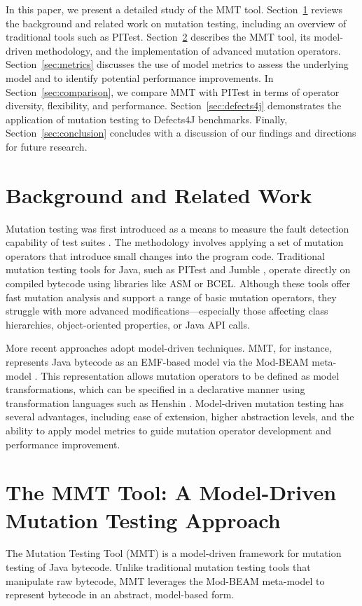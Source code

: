 \documentclass[sigplan, nonacm]{acmart}
\begin{document}
In this paper, we present a detailed study of the MMT tool. Section~\ref{sec:background} reviews the background and related work on mutation testing, including an overview of traditional tools such as PITest. Section~\ref{sec:mmt} describes the MMT tool, its model-driven methodology, and the implementation of advanced mutation operators. Section~\ref{sec:metrics} discusses the use of model metrics to assess the underlying model and to identify potential performance improvements. In Section~\ref{sec:comparison}, we compare MMT with PITest in terms of operator diversity, flexibility, and performance. Section~\ref{sec:defects4j} demonstrates the application of mutation testing to Defects4J benchmarks. Finally, Section~\ref{sec:conclusion} concludes with a discussion of our findings and directions for future research.

\section{Background and Related Work}
\label{sec:background}
Mutation testing was first introduced as a means to measure the fault detection capability of test suites \cite{Offutt2001}. The methodology involves applying a set of mutation operators that introduce small changes into the program code. Traditional mutation testing tools for Java, such as PITest \cite{Coles2016} and Jumble \cite{JumbleRef}, operate directly on compiled bytecode using libraries like ASM or BCEL. Although these tools offer fast mutation analysis and support a range of basic mutation operators, they struggle with more advanced modifications—especially those affecting class hierarchies, object-oriented properties, or Java API calls.

More recent approaches adopt model-driven techniques. MMT, for instance, represents Java bytecode as an EMF-based model via the Mod-BEAM meta-model \cite{Bockisch2024demonstration}. This representation allows mutation operators to be defined as model transformations, which can be specified in a declarative manner using transformation languages such as Henshin \cite{Henshin2010}. Model-driven mutation testing has several advantages, including ease of extension, higher abstraction levels, and the ability to apply model metrics to guide mutation operator development and performance improvement.

\section{The MMT Tool: A Model-Driven Mutation Testing Approach}
\label{sec:mmt}
The Mutation Testing Tool (MMT) is a model-driven framework for mutation testing of Java bytecode. Unlike traditional mutation testing tools that manipulate raw bytecode, MMT leverages the Mod-BEAM meta-model to represent bytecode in an abstract, model-based form.
\end{document}
